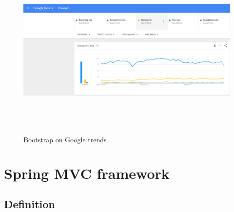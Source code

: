 \begin{figure}[!h]
	\centering
	\includegraphics[width=15.5cm,height=9cm]{Boostrap_statics_google_trends.png}
	\caption{Bootstrap on Google trends}
	\label{BootstrapOnGoogleTrends}
\end{figure}

\section{Spring MVC framework}

\subsection{Definition}

